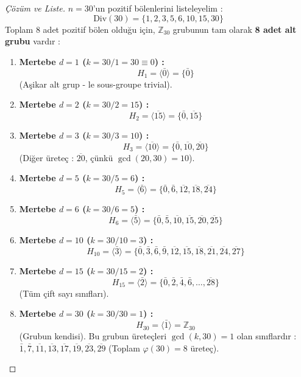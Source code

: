 \documentclass[12pt,a4paper]{report}
\begin{document}
\begin{proof}[Çözüm ve Liste]
$n = 30$'un pozitif bölenlerini listeleyelim :
\[ \text{Div}(30) = \{1, 2, 3, 5, 6, 10, 15, 30\} \]
Toplam 8 adet pozitif bölen olduğu için, $\mathbb{Z}_{30}$ grubunun tam olarak \textbf{8 adet alt grubu} vardır :

\begin{enumerate}
    \item \textbf{Mertebe $d = 1$ ($k = 30/1 = 30 \equiv 0$) :}
    \[ H_1 = \langle \bar{0} \rangle = \{\bar{0}\} \]
    (Aşikar alt grup - le sous-groupe trivial).
    
    \item \textbf{Mertebe $d = 2$ ($k = 30/2 = 15$) :}
    \[ H_2 = \langle \overline{15} \rangle = \{\bar{0}, \overline{15}\} \]
    
    \item \textbf{Mertebe $d = 3$ ($k = 30/3 = 10$) :}
    \[ H_3 = \langle \overline{10} \rangle = \{\bar{0}, \overline{10}, \overline{20}\} \]
    (Diğer üreteç : $\overline{20}$, çünkü $\gcd(20, 30) = 10$).
    
    \item \textbf{Mertebe $d = 5$ ($k = 30/5 = 6$) :}
    \[ H_5 = \langle \bar{6} \rangle = \{\bar{0}, \bar{6}, \overline{12}, \overline{18}, \overline{24}\} \]
    
    \item \textbf{Mertebe $d = 6$ ($k = 30/6 = 5$) :}
    \[ H_6 = \langle \bar{5} \rangle = \{\bar{0}, \bar{5}, \overline{10}, \overline{15}, \overline{20}, \overline{25}\} \]
    
    \item \textbf{Mertebe $d = 10$ ($k = 30/10 = 3$) :}
    \[ H_{10} = \langle \bar{3} \rangle = \{\bar{0}, \bar{3}, \bar{6}, \bar{9}, \overline{12}, \overline{15}, \overline{18}, \overline{21}, \overline{24}, \overline{27}\} \]
    
    \item \textbf{Mertebe $d = 15$ ($k = 30/15 = 2$) :}
    \[ H_{15} = \langle \bar{2} \rangle = \{\bar{0}, \bar{2}, \bar{4}, \bar{6}, \dots, \overline{28}\} \]
    (Tüm çift sayı sınıfları).
    
    \item \textbf{Mertebe $d = 30$ ($k = 30/30 = 1$) :}
    \[ H_{30} = \langle \bar{1} \rangle = \mathbb{Z}_{30} \]
    (Grubun kendisi). Bu grubun üreteçleri $\gcd(k, 30) = 1$ olan sınıflardır : $\bar{1}, \bar{7}, \overline{11}, \overline{13}, \overline{17}, \overline{19}, \overline{23}, \overline{29}$ (Toplam $\varphi(30) = 8$ üreteç).
\end{enumerate}
\end{proof}
\end{document}
